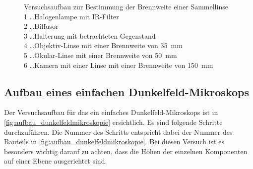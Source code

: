 \documentclass[12pt,english,ngerman]{scrartcl}
\begin{document}
\begin{figure}[H]
	\begin{center}
	\end{center}
	\caption[Versuchsaufbau zur Bestimmung der Brennweite einer Sammellinse] {
		Versuchsaufbau zur Bestimmung der Brennweite einer Sammellinse        \\
		1 \dots Halogenlampe mit IR-Filter                                    \\
		2 \dots Diffusor                                                      \\
		3 \dots Halterung mit betrachteten Gegenstand                         \\
		4 \dots Objektiv-Linse mit einer Brennweite von \SI{35}{\milli\meter} \\
		5 \dots Okular-Linse mit einer Brennweite von \SI{50}{\milli\meter}   \\
		6 \dots Kamera mit einer Linse mit einer Brennweite von \SI{150}{\milli\meter}
	}\label{fig:aufbau_hellmikroskopie}
\end{figure}

\subsection{Aufbau eines einfachen Dunkelfeld-Mikroskops}

Der Versuchsaufbau für das ein einfaches Dunkelfeld-Mikroskops ist in
\autoref{fig:aufbau_dunkelfeldmikroskopie} ersichtlich. Es sind folgende
Schritte durchzuführen. Die Nummer des Schritts entspricht dabei der Nummer des
Bauteils in \autoref{fig:aufbau_dunkelfeldmikroskopie}. Bei diesen Versuch ist
es besonders wichtig darauf zu achten, dass die Höhen der einzelnen Komponenten
auf einer Ebene ausgerichtet sind.
\end{document}
